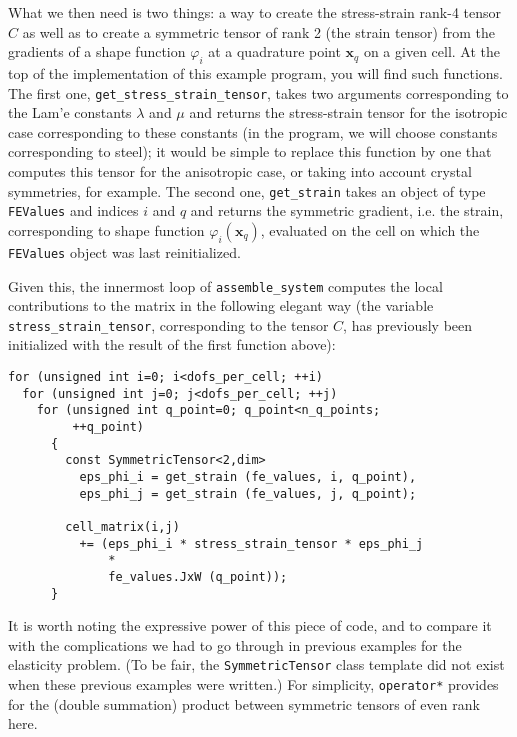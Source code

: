 \documentclass{article}
\renewcommand{\vec}[1]{\mathbf{#1}}
\begin{document}
\begin{itemize}
  What we then need is two things: a way to create the stress-strain rank-4
  tensor $C$ as well as to create a symmetric tensor of rank 2 (the strain
  tensor) from the gradients of a shape function $\varphi_i$ at a quadrature
  point $\vec x_q$ on a given cell. At the top of the implementation of this
  example program, you will find such functions. The first one,
  \texttt{get\_stress\_strain\_tensor}, takes two arguments corresponding to
  the Lam'e constants $\lambda$ and $\mu$ and returns the stress-strain tensor
  for the isotropic case corresponding to these constants (in the program, we
  will choose constants corresponding to steel); it would be simple to replace
  this function by one that computes this tensor for the anisotropic case, or
  taking into account crystal symmetries, for example. The second one,
  \texttt{get\_strain} takes an object of type \texttt{FEValues} and indices
  $i$ and $q$ and returns the symmetric gradient, i.e. the strain,
  corresponding to shape function $\varphi_i(\vec x_q)$, evaluated on the cell
  on which the \texttt{FEValues} object was last reinitialized.

  Given this, the innermost loop of \texttt{assemble\_system} computes the
  local contributions to the matrix in the following elegant way (the variable
  \texttt{stress\_strain\_tensor}, corresponding to the tensor $C$, has
  previously been initialized with the result of the first function above):
  \begin{verbatim}
for (unsigned int i=0; i<dofs_per_cell; ++i)
  for (unsigned int j=0; j<dofs_per_cell; ++j) 
    for (unsigned int q_point=0; q_point<n_q_points;
         ++q_point)
      {
        const SymmetricTensor<2,dim>
          eps_phi_i = get_strain (fe_values, i, q_point),
          eps_phi_j = get_strain (fe_values, j, q_point);

        cell_matrix(i,j) 
          += (eps_phi_i * stress_strain_tensor * eps_phi_j
              *
              fe_values.JxW (q_point));
      }
  \end{verbatim}
  It is worth noting the expressive power of this piece of code, and to
  compare it with the complications we had to go through in previous examples
  for the elasticity problem. (To be fair, the \texttt{SymmetricTensor} class
  template did not exist when these previous examples were written.) For
  simplicity, \texttt{operator*} provides for the (double summation) product
  between symmetric tensors of even rank here.


\end{itemize}
\end{document}
